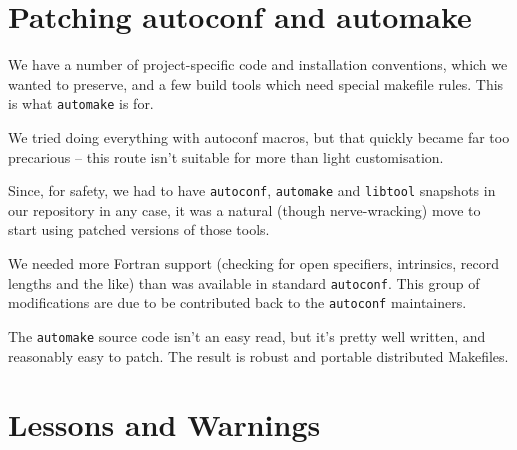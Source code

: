\documentclass[11pt,twoside]{article}
\begin{document}
\section{Patching autoconf and automake}

We have a number of project-specific code and installation
conventions, which we wanted to preserve, and a few build tools which
need special makefile rules.  This is what \texttt{automake} is for.

We tried doing everything with autoconf macros, but that quickly
became far too precarious -- this route isn't suitable for more than
light customisation.

Since, for safety, we had to have \texttt{autoconf}, \texttt{automake}
and \texttt{libtool} snapshots in our repository in any case, it was a
natural (though nerve-wracking) move to start using patched versions
of those tools.

We needed more Fortran support (checking for open specifiers,
intrinsics, record lengths and the like) than was 
available in standard \texttt{autoconf}.  This group of modifications
are due to be contributed back to the \texttt{autoconf} maintainers.

The \texttt{automake} source code isn't an easy read, but it's pretty
well written, and reasonably easy to patch.  The result is robust and
portable distributed Makefiles.



\section{Lessons and Warnings}
\end{document}
